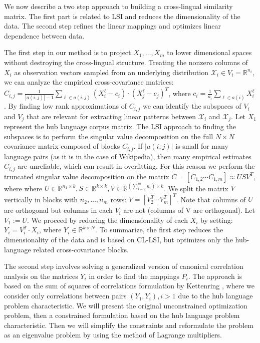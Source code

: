 \documentclass[twoside,11pt]{article}
\newcommand{\RR}{\mathbb{R}}
\begin{document}
We now describe a two step approach to building a cross-lingual similarity matrix. The first part is related to LSI and reduces the dimensionality of the data. The second step refines the linear mappings and optimizes linear dependence between data.

The first step in our method is to project $X_1, \ldots, X_m$ to lower dimensional spaces without destroying the cross-lingual structure. Treating the nonzero columns of $X_i$ as observation vectors sampled from an underlying distribution $\mathcal{X}_i \in V_i = \RR^{n_i}$, we can analyze the empirical cross-covariance matrices: $C_{i,j} = \frac{1}{|a(i,j)|-1 }\sum_{\ell \in a(i,j)} (X_i^{\ell} - c_i)\cdot (X_j^{\ell} - c_j)^T$, where $c_i = \frac{1}{a_i} \sum_{\ell \in a(i)}X_i^{\ell}$. By finding low rank approximations of $C_{i,j}$ we can identify the subspaces of $V_i$ and $V_j$ that are relevant for extracting linear patterns between $\mathcal{X}_i$ and $\mathcal{X}_j$. Let $X_1$ represent the hub language corpus matrix. The LSI approach to finding the subspaces is to perform the singular value decomposition on the full $N \times N$ covariance matrix composed of blocks $C_{i,j}$. If $|a(i,j)|$ is small for many language pairs (as it is in the case of Wikipedia), then many empirical estimates $C_{i,j}$ are unreliable, which can result in overfitting. For this reason we perform the truncated singular value decomposition on the matrix $C = [C_{1,2}  \cdots  C_{1,m}] \approx U S V^T$, where where $U \in \RR^{n_1 \times k}, S \in \RR^{k \times k}, V \in \RR^{(\sum_{i=2}^m n_i) \times k}$. We split the matrix $V$ vertically in blocks with $n_2, \ldots, n_m$ rows: $V = [V_2^T  \cdots  V_m^T]^T$. Note that columns of $U$ are orthogonal but columns in each $V_i$ are not (columns of V are orthogonal). Let $V_1 := U$. We proceed by reducing the dimensionality of each $X_i$ by setting: $Y_i = V_i^T \cdot X_i$, where $Y_i \in \RR^{k\times N}$. To summarize, the first step reduces the dimensionality of the data and is based on CL-LSI, but optimizes only the hub-language related cross-covariance blocks.

The second step involves solving a generalized version of canonical correlation analysis on the matrices $Y_i$ in order to find the mappings $P_i$. The approach is based on the sum of squares of correlations formulation by Kettenring \cite{Kettenring}, where we consider only correlations between pairs $(Y_1, Y_i), i >1$ due to the hub language problem characteristic.
We will present the original unconstrained optimization problem, then a constrained formulation based on the hub language problem characteristic. Then we will simplify the constraints and reformulate
the problem as an eigenvalue problem by using the method of Lagrange multipliers.
\end{document}
